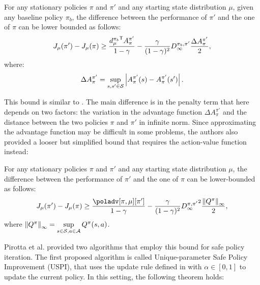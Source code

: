 \begin{theorem}\label{th:pirotta-bound1}
For any stationary policies $\pi$ and $\pi'$ and any starting state distribution $\mu$, given any baseline policy $\pi_b$, the difference between the performance of $\pi'$ and the one of $\pi$ can be lower bounded as follows\footnotemark:
\begin{equation}
J_{\mu}(\pi') - J_\mu(\pi) \geq \frac{\transpose{d_\mu^{\pi_b}}A_\pi^{\pi'}}{1-\gamma} - \frac{\gamma}{(1-\gamma)^2}{D_\infty^{\pi_b, \pi'}} \frac{\Delta A_{\pi}^{\pi'}}{2},
\end{equation}
where:
\begin{equation}
\Delta A_{\pi}^{\pi'} = \sup_{s, s'\in\sspace}\left|{A_\pi^{\pi'}(s) - A_\pi^{\pi'}(s')}\right|.
\end{equation}
\end{theorem}

This bound is similar to . The main difference is in the penalty term that here depends on two factors: the variation in the advantage function $\Delta A_\pi^{\pi'}$ and the distance between the two policies $\pi$ and $\pi'$ in infinite norm. Since approximating the advantage function may be difficult in some problems, the authors also provided a looser but simplified bound that requires the action-value function instead:

\begin{theorem}
\label{th:pirotta-bound2}
For any stationary policies $\pi$ and $\pi'$ and any starting state distribution $\mu$, the difference between the performance of $\pi'$ and the one of $\pi$ can be lower-bounded as follows:
\begin{equation}
J_{\mu}(\pi') - J_\mu(\pi) \geq \frac{\poladv[\pi, \mu][\pi']}{1-\gamma} - \frac{\gamma}{(1-\gamma)^2}{D_\infty^{\pi, \pi'}}^2 \frac{\norm[\infty]{Q^\pi}}{2},
\end{equation}
where $\norm[\infty]{Q^{\pi}}=\sup\limits_{\substack{s\in\sspace, a\in\aspace}}Q^{\pi}(s,a)$.
\end{theorem}

Pirotta et al. provided two algorithms that employ this bound for safe policy iteration. The first proposed algorithm is called Unique-parameter Safe Policy Improvement (USPI), that uses the update rule defined in  with $\alpha\in [0,1]$ to update the current policy. In this setting, the following theorem holds:

